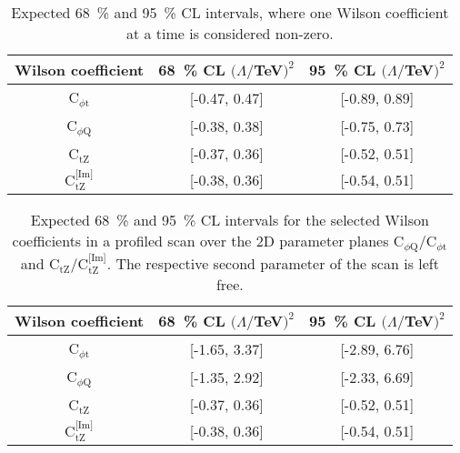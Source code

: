 \documentclass[letterpaper,11pt]{article}
\def\ctZ{C$_\text{tZ}$\xspace}
\def\ctZI{C$_\text{tZ}^\text{[Im]}$\xspace}
\def\cpt{C$_{\phi \text{t}}$\xspace}
\def\cpQM{C$_{\phi \text{Q}}$\xspace}
\begin{document}
\begin{table}[H]
\caption{Expected 68~\% and 95~\% CL intervals, where one Wilson coefficient at a time is considered non-zero.}\label{tab:limits}
\begin{center}
\begin{tabular}{c|c|c}
\hline
Wilson coefficient & 68~\% CL $(\Lambda/$TeV$)^2$ & 95~\% CL $(\Lambda/$TeV$)^2$ \\
\hline
\hline
\cpt   & [-0.47, 0.47]                 & [-0.89, 0.89]                 \\
\hline
\cpQM  & [-0.38, 0.38]                 & [-0.75, 0.73]                 \\
\hline
\ctZ   & [-0.37, 0.36]                 & [-0.52, 0.51]                 \\
\hline
\ctZI  & [-0.38, 0.36]                 & [-0.54, 0.51]                 \\
\hline
\end{tabular}
\end{center}
\end{table}

\begin{table}[H]
\caption{Expected 68~\% and 95~\% CL intervals for the selected Wilson coefficients in a profiled scan over the 2D parameter planes \cpQM/\cpt and \ctZ/\ctZI. The respective second parameter of the scan is left free.}\label{tab:proflimits}
\begin{center}
\begin{tabular}{c|c|c}
\hline
Wilson coefficient & 68~\% CL $(\Lambda/$TeV$)^2$ & 95~\% CL $(\Lambda/$TeV$)^2$ \\
\hline
\hline
\cpt   & [-1.65, 3.37]                 & [-2.89, 6.76]                 \\
\hline
\cpQM  & [-1.35, 2.92]                 & [-2.33, 6.69]                 \\
\hline
\ctZ   & [-0.37, 0.36]                 & [-0.52, 0.51]                 \\
\hline
\ctZI  & [-0.38, 0.36]                 & [-0.54, 0.51]                 \\
\hline
\end{tabular}
\end{center}
\end{table}
\end{document}
